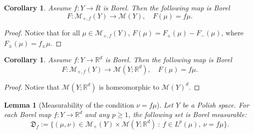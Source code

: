 \documentclass[10pt,leqno]{amsart}
\numberwithin{equation}{section}
\newtheorem{co}[teorema]{Corollary}
\newtheorem{lemma}[teorema]{Lemma}
\newcommand{\R}{\mathbb{R}}
\begin{document}
\begin{co}
    Assume $f:Y\to\overline{R}$ is Borel. Then the following map is Borel
    \[F:\mathcal{M}_{+,f}(Y) \to \mathcal{M}(Y), \quad F(\mu) = f\mu.\]
\end{co}
\begin{proof}
    Notice that for all $\mu \in \mathcal{M}_{+,f}(Y)$, $F(\mu) = F_+(\mu) - F_-(\mu)$, where $F_{\pm}(\mu) = f_{\pm}\mu$.
\end{proof}

\begin{co}\label{measurability vector measure f mu}
    Assume $f:Y\to\R^d$ is Borel. Then the following map is Borel
    \[F:\mathcal{M}_{+,f}(Y) \to \mathcal{M}(Y;\R^d), \quad F(\mu) = f\mu.\]
\end{co}

\begin{proof}
    Notice that $\mathcal{M}(Y;\R^d)$ is homeomorphic to $\mathcal{M}(Y)^{d}$.
\end{proof}

\begin{lemma}[Measurability of the condition $\nu=f\mu$]\label{measurability nu=f mu}
    Let $Y$ be a Polish space. For each Borel map $f:Y\to \R^d$ and any $p\geq 1$, the following set is Borel measurable:
    \[\mathfrak{D}_f:=\{(\mu,\nu) \in \mathcal{M}_+(Y)\times \mathcal{M}(Y;\R^d) \ : \ f\in L^p(\mu), \ \nu = f \mu\}.\]
\end{lemma} 
\end{document}
